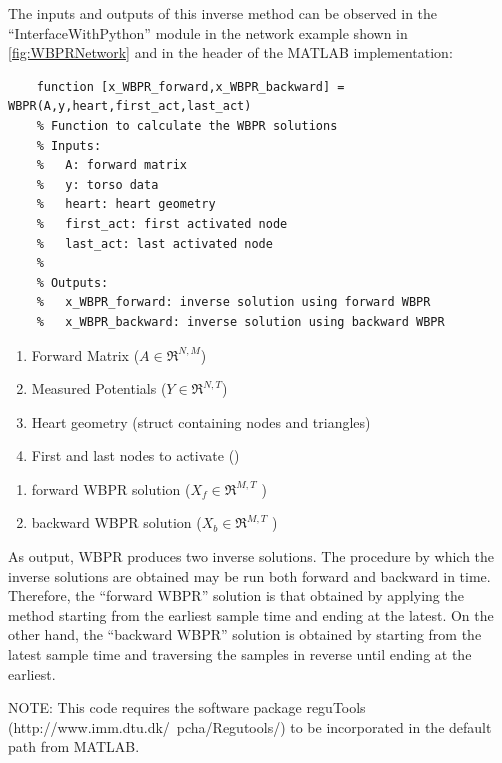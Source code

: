     The inputs and outputs of this inverse method can be observed in the ``InterfaceWithPython'' module in the network example shown in \autoref{fig:WBPRNetwork} and in the header of the MATLAB implementation:
    \begin{verbatim}
    function [x_WBPR_forward,x_WBPR_backward] = WBPR(A,y,heart,first_act,last_act)
    % Function to calculate the WBPR solutions
    % Inputs:
    %   A: forward matrix
    %   y: torso data
    %   heart: heart geometry
    %   first_act: first activated node
    %   last_act: last activated node
    %
    % Outputs:
    %   x_WBPR_forward: inverse solution using forward WBPR
    %   x_WBPR_backward: inverse solution using backward WBPR
    \end{verbatim}

    \begin{enumerate}
        \item Forward Matrix ($A\in\Re^{N,M}$)
        \item Measured Potentials ($Y\in\Re^{N,T}$)
        \item Heart geometry (struct containing nodes and triangles)
        \item First and last nodes to activate ()
    \end{enumerate}

    \begin{enumerate}
        \item forward WBPR solution ($X_f\in\Re^{M,T}$ )
        \item backward WBPR solution ($X_b\in\Re^{M,T}$ )
    \end{enumerate}
    As output, WBPR produces two inverse solutions. The procedure by which the inverse solutions are obtained may be run both forward and backward in time. Therefore, the ``forward WBPR'' solution is that obtained by applying the method starting from the earliest sample time and ending at the latest. On the other hand, the ``backward WBPR'' solution is obtained by starting from the latest sample time and traversing the samples in reverse until ending at the earliest.

    NOTE: This code requires the software package reguTools (http://www.imm.dtu.dk/~pcha/Regutools/) to be incorporated in the default path from MATLAB.

